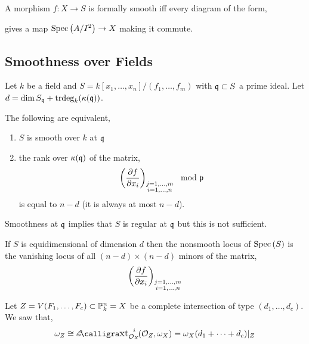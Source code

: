 \documentclass[12pt]{article}
\begin{document}
\begin{defn}
A morphism $f : X \to S$ is formally smooth iff every diagram of the form,
\begin{center}
\end{center}
gives a map $\Spec{A/I^2} \to X$ making it commute.
\end{defn}

\subsection{Smoothness over Fields}

Let $k$ be a field and $S = k[x_1, \dots, x_n]/(f_1, \dots, f_m)$ with $\q \subset S$ a prime ideal. Let $d = \dim{S_\q} + \trdeg{k}{\kappa(\q)}$.

\begin{prop}
The following are equivalent,
\begin{enumerate}
\item $S$ is smooth over $k$ at $\q$ 
\item the rank over $\kappa(\q)$ of the matrix,
\[ \left( \pderiv{f}{x_i} \right)_{\substack{j = 1, \dots, m \\ i = 1, \dots , n}} \mod \p \]
is equal to $n - d$ (it is always at most $n - d$).
\end{enumerate}
\end{prop} 

\begin{rmk}
Smoothness at $\q$ implies that $S$ is regular at $\q$ but this is not sufficient.
\end{rmk}

\begin{rmk}
If $S$ is equidimensional of dimension $d$ then the nonsmooth locus of $\Spec{S}$ is the vanishing locus of all $(n-d) \times (n-d)$ minors of the matrix,
\[ \left( \pderiv{f}{x_i} \right)_{\substack{j = 1, \dots, m \\ i = 1, \dots , n}} \]
\end{rmk}

\begin{example}
Let $Z = V(F_1, \dots, F_c) \subset \P^n_k = X$ be a complete intersection of type $(d_1, \dots, d_c)$. We saw that,
\[ \omega_Z \cong \shExt{i}{\struct{X}}{\struct{Z}}{\omega_X} = \omega_X(d_1 + \cdots + d_c) |_Z \]
\end{example}
\end{document}

